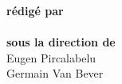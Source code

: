 \begin{titlepage}

	\begin{center}

		

		\textsc{\LARGE \projecttitle }\\[0.5cm]%
		{\Large \projectdescription}\\ [1cm]%

		\HRule%
		\vspace{0.4cm}%

		{\huge \bfseries \articletitle}\\[0.4cm]%
		
		\HRule%
		\vspace{1.5cm}%

	\vfill%
	\end{center}%
	
	
	
	\begin{flushright} \Large
		\textbf{rédigé par}%
		\\
		\auteur%
		\\
		\textbf{sous la direction de}%
		\\
		Eugen Pircalabelu
		\\
		Germain Van Bever
	\end{flushright}



	\begin{center}
		{\large{\customdate}}
	\end{center}
\end{titlepage}
